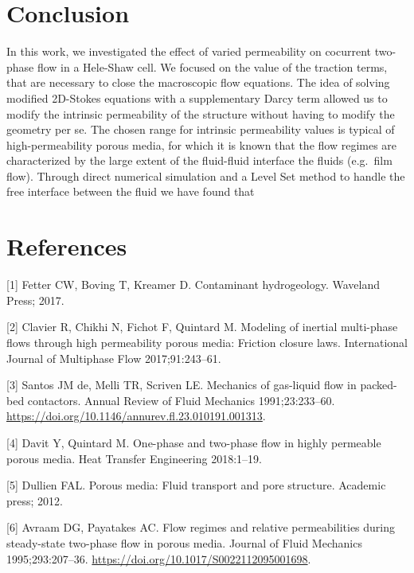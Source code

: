 \documentclass[]{article}
\begin{document}
\hypertarget{conclusion}{%
\section{Conclusion}\label{conclusion}}

In this work, we investigated the effect of varied permeability on
cocurrent two-phase flow in a Hele-Shaw cell. We focused on the value of
the traction terms, that are necessary to close the macroscopic flow
equations. The idea of solving modified 2D-Stokes equations with a
supplementary Darcy term allowed us to modify the intrinsic permeability
of the structure without having to modify the geometry per se. The
chosen range for intrinsic permeability values is typical of
high-permeability porous media, for which it is known that the flow
regimes are characterized by the large extent of the fluid-fluid
interface the fluids (e.g.~film flow). Through direct numerical
simulation and a Level Set method to handle the free interface between
the fluid we have found that

\hypertarget{references}{%
\section*{References}\label{references}}

\hypertarget{refs}{}
\leavevmode\hypertarget{ref-fetter2017contaminant}{}%
{[}1{]} Fetter CW, Boving T, Kreamer D. Contaminant hydrogeology.
Waveland Press; 2017.

\leavevmode\hypertarget{ref-clavier2017modeling}{}%
{[}2{]} Clavier R, Chikhi N, Fichot F, Quintard M. Modeling of inertial
multi-phase flows through high permeability porous media: Friction
closure laws. International Journal of Multiphase Flow 2017;91:243--61.

\leavevmode\hypertarget{ref-Santos1991}{}%
{[}3{]} Santos JM de, Melli TR, Scriven LE. Mechanics of gas-liquid flow
in packed-bed contactors. Annual Review of Fluid Mechanics
1991;23:233--60.
\url{https://doi.org/10.1146/annurev.fl.23.010191.001313}.

\leavevmode\hypertarget{ref-davit2018one}{}%
{[}4{]} Davit Y, Quintard M. One-phase and two-phase flow in highly
permeable porous media. Heat Transfer Engineering 2018:1--19.

\leavevmode\hypertarget{ref-dullien2012porous}{}%
{[}5{]} Dullien FAL. Porous media: Fluid transport and pore structure.
Academic press; 2012.

\leavevmode\hypertarget{ref-Avraam1995a}{}%
{[}6{]} Avraam DG, Payatakes AC. Flow regimes and relative
permeabilities during steady-state two-phase flow in porous media.
Journal of Fluid Mechanics 1995;293:207--36.
\url{https://doi.org/10.1017/S0022112095001698}.
\end{document}
